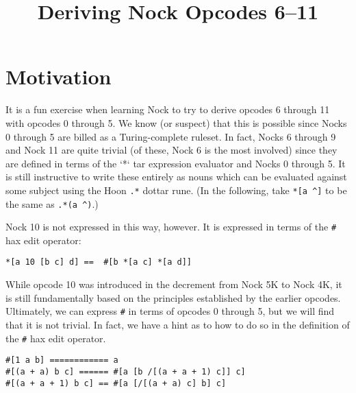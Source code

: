 \documentclass[twoside]{article}
\title{Deriving Nock Opcodes 6--11}
\author{\authorpatp}
\date{}
\begin{document}
\maketitle
\thispagestyle{firststyle}

\begin{abstract}
\end{abstract}

\setcounter{page}{1}

\tableofcontents

\section{Motivation}

It is a fun exercise when learning Nock to try to derive opcodes 6 through 11 with opcodes 0 through 5. We know (or suspect) that this is possible since Nocks 0 through 5 are billed as a Turing-complete ruleset. In fact, Nocks 6 through 9 and Nock 11 are quite trivial (of these, Nock 6 is the most involved) since they are defined in terms of the `*` tar expression evaluator and Nocks 0 through 5. It is still instructive to write these entirely as nouns which can be evaluated against some subject using the Hoon \lstinline[style=inlinecode]{.*} dottar rune. (In the following, take \lstinline[style=inlinecode]{*[a ^]} to be the same as \lstinline[style=inlinecode]{.*(a ^)}.)

Nock 10 is not expressed in this way, however. It is expressed in terms of the \lstinline[style=inlinecode]{#} hax edit operator:

\begin{lstlisting}[style=listingblock]
*[a 10 [b c] d] ==  #[b *[a c] *[a d]]
\end{lstlisting}

While opcode 10 was introduced in the decrement from Nock 5K to Nock 4K, it is still fundamentally based on the principles established by the earlier opcodes.  Ultimately, we can express \lstinline[style=inlinecode]{#} in terms of opcodes 0 through 5, but we will find that it is not trivial. In fact, we have a hint as to how to do so in the definition of the \lstinline[style=inlinecode]{#} hax edit operator.

\begin{lstlisting}[style=listingblock]
#[1 a b] ============ a
#[(a + a) b c] ====== #[a [b /[(a + a + 1) c]] c]
#[(a + a + 1) b c] == #[a [/[(a + a) c] b] c]
\end{lstlisting}
\end{document}
